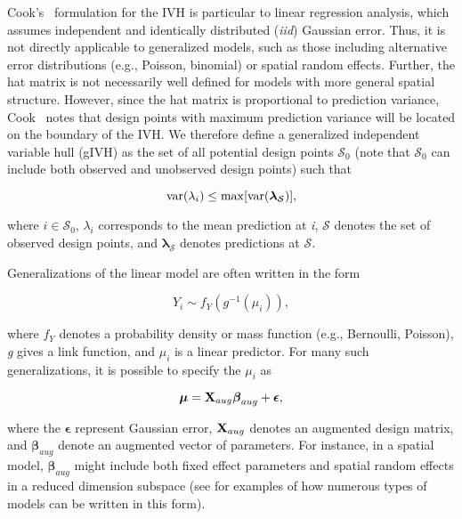 \documentclass[10pt,letterpaper]{article}
\begin{document}
Cook's~\cite{Cook1979} formulation for the IVH is particular to linear regression analysis, which assumes independent and identically distributed (\textit{iid}) Gaussian error. Thus, it is not directly applicable to generalized models, such as those including alternative error distributions (e.g., Poisson, binomial) or spatial random effects.  Further, the hat matrix is not necessarily well defined for models with more general spatial structure. However, since the hat matrix is proportional to prediction variance, Cook~\cite{Cook1979} notes that design points with maximum prediction variance will be located on the boundary of the IVH.  We therefore define a generalized independent variable hull (gIVH) as the set of all potential design points $\mathcal{S}_0$ (note that $\mathcal{S}_0$ can include both observed and unobserved design points) such that
\begin{linenomath*}
\begin{equation}
  \label{eq:gIVH}
  {\rm var}(\lambda_i) \le {\rm max} [{\rm var}(\boldsymbol{\lambda}_{\mathcal{S}})],
\end{equation}
\end{linenomath*}
where $i \in \mathcal{S}_0$, $\lambda_i$ corresponds to the mean prediction at \textit{i}, $\mathcal{S}$ denotes the set of observed design points, and $\boldsymbol{\lambda}_\mathcal{S}$ denotes predictions at $\mathcal{S}$.

Generalizations of the linear model are often written in the form
\begin{linenomath*}
\begin{equation}
  Y_i \sim f_Y(g^{-1}(\mu_i)),
  \label{eq:Y}
\end{equation}
\end{linenomath*}
where $f_Y$ denotes a probability density or mass function (e.g., Bernoulli, Poisson), \textit{g} gives a link function, and
$\mu_i$ is a linear predictor.  For many such generalizations, it is possible to specify the $\mu_i$ as
\begin{linenomath*}
\begin{equation}
  \boldsymbol{\mu} = {\bf X}_{aug}\boldsymbol{\beta}_{aug} + \boldsymbol{\epsilon},
  \label{eq:mu-aug}
\end{equation}
\end{linenomath*}
where the $\boldsymbol{\epsilon}$ represent Gaussian error, ${\bf X}_{aug}$ denotes an augmented design matrix, and $\boldsymbol{\beta}_{aug}$ denote an augmented vector of parameters.  For instance, in a spatial model, $\boldsymbol{\beta}_{aug}$ might include both fixed effect parameters and spatial random effects in a reduced dimension subspace (see  for examples of how numerous types of models can be written in this form).
\end{document}
